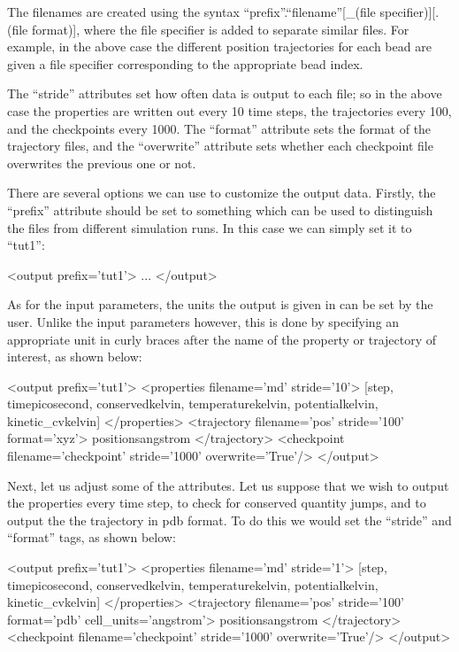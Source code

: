 \documentclass[11pt,english,fleqn]{report}
\newenvironment{code}{%
\footnotesize 
\verbatim
}{
\endverbatim
\normalsize
}
\begin{document}
The filenames are created using the syntax 
{}``prefix''.{}``filename''[\_(file specifier)][.(file format)], where the file specifier is
added to separate similar files. For example, in the above case the 
different position trajectories for each bead are given a file specifier
corresponding to the appropriate bead index.

The {}``stride'' attributes set how often data is output to each file;
so in the above case the properties are written out every 10 time steps,
the trajectories every 100, and the checkpoints every 1000.
The {}``format'' attribute sets the format of the trajectory files,
and the {}``overwrite'' attribute sets whether each checkpoint file 
overwrites the previous one or not.

There are several options we can use to customize the
output data. Firstly, the {}``prefix'' attribute should be set to
something which can be used to distinguish the files from different
simulation runs. In this case we can simply set it to {}``tut1'':

\begin{code}
<output prefix='tut1'>
   ...
</output>
\end{code}

As for the input parameters, the units the output is given in can be
set by the user. Unlike the input parameters however, 
this is done by specifying an
appropriate unit in curly braces after the name of the 
property or trajectory of interest, as shown below:

\begin{code}
<output prefix='tut1'>
   <properties filename='md' stride='10'>
      [step, time{picosecond}, conserved{kelvin}, 
       temperature{kelvin}, potential{kelvin}, kinetic_cv{kelvin}] 
   </properties>
   <trajectory filename='pos' stride='100' format='xyz'>
      positions{angstrom} 
   </trajectory>
   <checkpoint filename='checkpoint' stride='1000' overwrite='True'/>
</output>
\end{code}

Next, let us adjust some of the attributes. Let us suppose that we
wish to output the properties every time step, to check for conserved
quantity jumps, and to output the the trajectory in pdb format.
To do this we would set the {}``stride'' and {}``format'' tags,
as shown below:

\begin{code}
<output prefix='tut1'>
   <properties filename='md' stride='1'>
      [step, time{picosecond}, conserved{kelvin}, 
       temperature{kelvin}, potential{kelvin}, kinetic_cv{kelvin}] 
   </properties>
   <trajectory filename='pos' stride='100' format='pdb' cell_units='angstrom'>
      positions{angstrom} 
   </trajectory>
   <checkpoint filename='checkpoint' stride='1000' overwrite='True'/>
</output>
\end{code}
\end{document}
